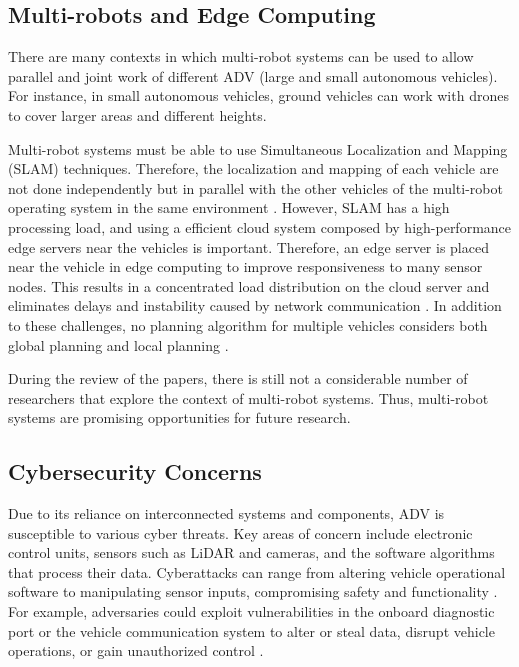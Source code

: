 \documentclass[lettersize,journal]{IEEEtran}
\begin{document}
\subsection{Multi-robots and Edge Computing}
There are many contexts in which multi-robot systems can be used to allow parallel and joint work of different ADV (large and small autonomous vehicles). For instance, in small autonomous vehicles, ground vehicles can work with drones to cover larger areas and different heights.

Multi-robot systems must be able to use Simultaneous Localization and Mapping (SLAM) techniques. Therefore, the localization and mapping of each vehicle are not done independently but in parallel with the other vehicles of the multi-robot operating system in the same environment \cite{9767431}. However, SLAM has a high processing load, and using a efficient cloud system \cite{liu2017b} composed by high-performance edge servers near the vehicles is important. Therefore, an edge server is placed near the vehicle in edge computing to improve responsiveness to many sensor nodes. This results in a concentrated load distribution on the cloud server and eliminates delays and instability caused by network communication \cite{BILAL201894}. In addition to these challenges, no planning algorithm for multiple vehicles considers both global planning and local planning \cite{9902730}.

During the review of the papers, there is still not a considerable number of researchers that explore the context of multi-robot systems. Thus, multi-robot systems are promising opportunities for future research.

\color{black}\subsection{Cybersecurity Concerns} 

Due to its reliance on interconnected systems and components, ADV is susceptible to various cyber threats. Key areas of concern include electronic control units, sensors such as LiDAR and cameras, and the software algorithms that process their data. Cyberattacks can range from altering vehicle operational software to manipulating sensor inputs, compromising safety and functionality \cite{KIM2021}. For example, adversaries could exploit vulnerabilities in the onboard diagnostic port or the vehicle communication system to alter or steal data, disrupt vehicle operations, or gain unauthorized control \cite{PHAM2021}.
\end{document}
